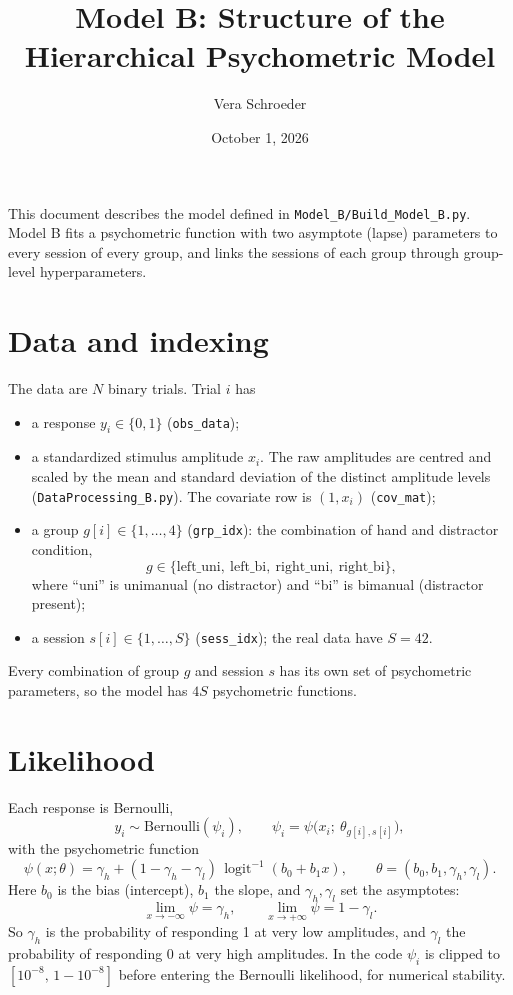 \documentclass[11pt]{article}
\title{Model B: Structure of the Hierarchical Psychometric Model}
\author{Vera Schroeder}
\date{October 1, 2026}
\newcommand{\invlogit}{\operatorname{logit}^{-1}}
\newcommand{\code}[1]{\texttt{#1}}
\begin{document}
\maketitle

\noindent
This document describes the model defined in \code{Model\_B/Build\_Model\_B.py}.
Model B fits a psychometric function with two asymptote (lapse) parameters to
every session of every group, and links the sessions of each group through
group-level hyperparameters.

\section{Data and indexing}

The data are $N$ binary trials. Trial $i$ has
\begin{itemize}
  \item a response $y_i \in \{0,1\}$ (\code{obs\_data});
  \item a standardized stimulus amplitude $x_i$. The raw amplitudes are centred
        and scaled by the mean and standard deviation of the distinct amplitude
        levels (\code{DataProcessing\_B.py}). The covariate row is
        $(1, x_i)$ (\code{cov\_mat});
  \item a group $g[i] \in \{1,\dots,4\}$ (\code{grp\_idx}): the combination of
        hand and distractor condition,
        \[
          g \in \{\text{left\_uni},\ \text{left\_bi},\ \text{right\_uni},\ \text{right\_bi}\},
        \]
        where ``uni'' is unimanual (no distractor) and ``bi'' is bimanual
        (distractor present);
  \item a session $s[i] \in \{1,\dots,S\}$ (\code{sess\_idx}); the real data have
        $S = 42$.
\end{itemize}
Every combination of group $g$ and session $s$ has its own set of psychometric
parameters, so the model has $4S$ psychometric functions.

\section{Likelihood}

Each response is Bernoulli,
\[
  y_i \sim \text{Bernoulli}(\psi_i), \qquad
  \psi_i = \psi\big(x_i;\ \theta_{g[i],s[i]}\big),
\]
with the psychometric function
\[
  \psi(x;\theta) = \gamma_h + (1 - \gamma_h - \gamma_l)\,\invlogit(b_0 + b_1 x),
  \qquad \theta = (b_0, b_1, \gamma_h, \gamma_l).
\]
Here $b_0$ is the bias (intercept), $b_1$ the slope, and $\gamma_h,\gamma_l$
set the asymptotes:
\[
  \lim_{x\to-\infty}\psi = \gamma_h, \qquad \lim_{x\to+\infty}\psi = 1-\gamma_l .
\]
So $\gamma_h$ is the probability of responding 1 at very low amplitudes, and
$\gamma_l$ the probability of responding 0 at very high amplitudes. In the code
$\psi_i$ is clipped to $[10^{-8},\,1-10^{-8}]$ before entering the Bernoulli
likelihood, for numerical stability.
\end{document}
